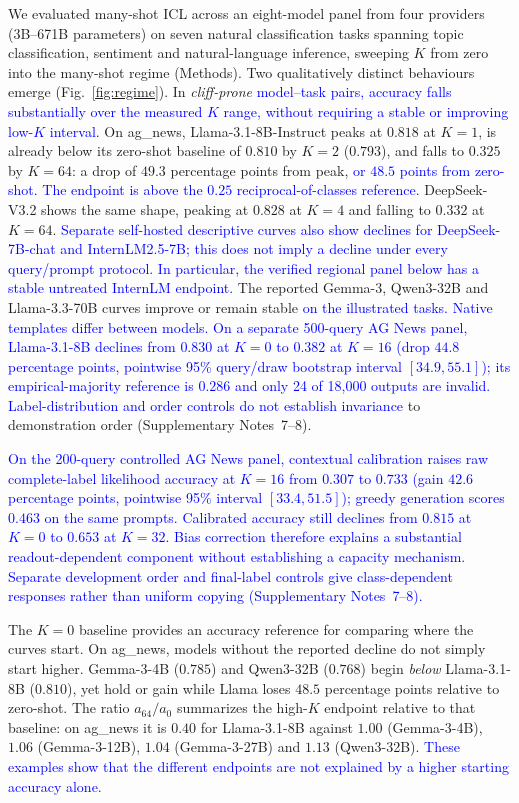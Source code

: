 \documentclass[pdflatex, sn-nature]{sn-jnl}%
\theoremstyle{thmstyleone}%
\theoremstyle{thmstyletwo}%
\theoremstyle{thmstylethree}%
\begin{document}
We evaluated many-shot ICL across an eight-model panel from four providers (3B--671B
parameters) on seven natural classification tasks spanning topic classification,
sentiment and natural-language inference, sweeping $K$ from zero into the many-shot
regime (Methods). Two qualitatively distinct behaviours emerge (Fig.~\ref{fig:regime}).
In \emph{cliff-prone} \textcolor{blue}{model--task pairs, accuracy falls substantially over the measured
$K$ range, without requiring a stable or improving low-$K$ interval}. On ag\_news,
Llama-3.1-8B-Instruct peaks at $0.818$ at $K{=}1$, is already below its zero-shot baseline
of $0.810$ by $K{=}2$ ($0.793$), and falls to $0.325$ by $K{=}64$: a drop of $49.3$
percentage points from peak, \textcolor{blue}{or $48.5$ points from zero-shot. The endpoint is above the
$0.25$ reciprocal-of-classes reference}. DeepSeek-V3.2 shows the same shape, peaking at
$0.828$ at $K{=}4$ and falling to $0.332$ at $K{=}64$. \textcolor{blue}{Separate self-hosted descriptive curves also show declines for DeepSeek-7B-chat and InternLM2.5-7B; this does not imply a decline under every query/prompt protocol. In particular, the verified regional panel below has a stable untreated InternLM endpoint.} The reported
Gemma-3, Qwen3-32B and Llama-3.3-70B curves improve or remain stable \textcolor{blue}{on the illustrated
tasks. Native templates differ between models. On a separate 500-query AG News panel,
Llama-3.1-8B declines from $0.830$ at $K{=}0$ to $0.382$ at $K{=}16$
(drop $44.8$ percentage points, pointwise 95\%} \textcolor{blue}{query/draw bootstrap interval
$[34.9,55.1]$); its empirical-majority reference is $0.286$ and only 24 of 18,000
outputs are invalid. Label-distribution and order controls do not establish
invariance} to demonstration order (Supplementary Notes~7--8).

\textcolor{blue}{On the 200-query controlled AG News panel, contextual calibration raises raw complete-label likelihood accuracy at $K{=}16$ from $0.307$ to $0.733$ (gain $42.6$ percentage points, pointwise 95\%} \textcolor{blue}{interval $[33.4,51.5]$); greedy generation scores $0.463$ on the same prompts. Calibrated accuracy still declines from $0.815$ at $K{=}0$ to $0.653$ at $K{=}32$. Bias correction therefore explains a substantial readout-dependent component without establishing a capacity mechanism. Separate development order and final-label controls give class-dependent responses rather than uniform copying (Supplementary Notes}~\textcolor{blue}{7--8).}

The $K{=}0$ baseline provides an accuracy reference for comparing where the curves
start. On ag\_news, models without the reported decline do not simply start higher.
Gemma-3-4B ($0.785$) and Qwen3-32B ($0.768$) begin \emph{below} Llama-3.1-8B ($0.810$),
yet hold or gain while Llama loses $48.5$ percentage points relative to zero-shot. The
ratio $a_{64}/a_{0}$ summarizes the high-$K$ endpoint relative to that baseline: on
ag\_news it is $0.40$ for Llama-3.1-8B against $1.00$ (Gemma-3-4B), $1.06$
(Gemma-3-12B), $1.04$ (Gemma-3-27B) and $1.13$ (Qwen3-32B). \textcolor{blue}{These examples show that
the different endpoints are not explained by a higher starting accuracy alone.}
\end{document}
